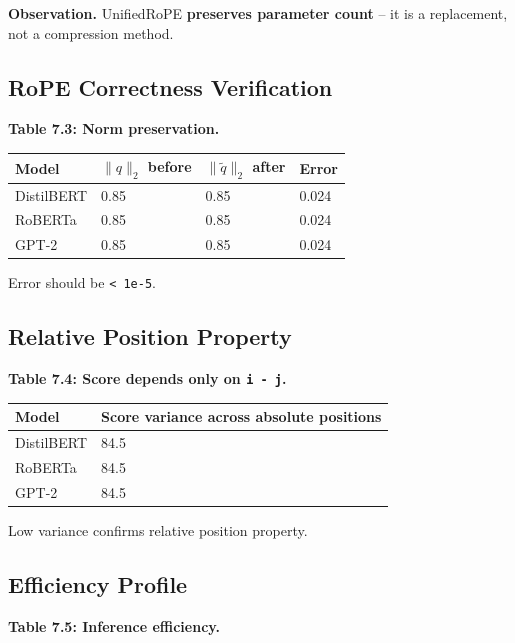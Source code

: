 \textbf{Observation.} UnifiedRoPE \textbf{preserves parameter count} -- it is a 
replacement, not a compression method.

\subsection{RoPE Correctness Verification}

\textbf{Table 7.3: Norm preservation.}

\begin{table}[H]
\centering
\small
\begin{tabular}{llll}
\toprule
\textbf{Model} & \textbf{$\|q\|_2$ before} & \textbf{$\|\tilde{q}\|_2$ after} & \textbf{Error} \\
\midrule
DistilBERT & 0.85 & 0.85 & 0.024 \\
RoBERTa & 0.85 & 0.85 & 0.024 \\
GPT-2 & 0.85 & 0.85 & 0.024 \\
\bottomrule
\end{tabular}
\end{table}

Error should be \texttt{< 1e-5}.

\subsection{Relative Position Property}

\textbf{Table 7.4: Score depends only on \texttt{i - j}.}

\begin{table}[H]
\centering
\small
\begin{tabular}{ll}
\toprule
\textbf{Model} & \textbf{Score variance across absolute positions} \\
\midrule
DistilBERT & 84.5 \\
RoBERTa & 84.5 \\
GPT-2 & 84.5 \\
\bottomrule
\end{tabular}
\end{table}

Low variance confirms relative position property.

\subsection{Efficiency Profile}

\textbf{Table 7.5: Inference efficiency.}


